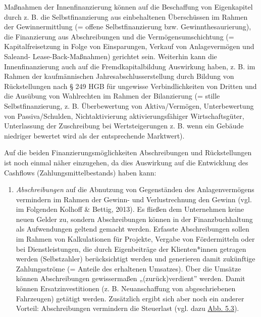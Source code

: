 \documentclass[
  letterpaper,
]{book}
\providecommand{\tightlist}{%
  \setlength{\itemsep}{0pt}\setlength{\parskip}{0pt}}
\begin{document}
Maßnahmen der Innenfinanzierung können auf die Beschaffung von
Eigenkapitel durch z. B. die Selbstfinanzierung aus einbehaltenen
Überschüssen im Rahmen der Gewinnermittlung (= offene Selbstfinanzierung
bzw. Gewinnthesaurierung), die Finanzierung aus Abschreibungen und die
Vermögensumschichtung (= Kapitalfreisetzung in Folge von Einsparungen,
Verkauf von Anlagevermögen und Saleand- Lease-Back-Maßnahmen) gerichtet
sein. Weiterhin kann die Innenfinanzierung auch auf die
Fremdkapitalbildung Auswirkung haben, z. B. im Rahmen der kaufmännischen
Jahresabschlusserstellung durch Bildung von Rückstellungen nach § 249
HGB für ungewisse Verbindlichkeiten von Dritten und die Ausübung von
Wahlrechten im Rahmen der Bilanzierung (= stille Selbstfinanzierung, z.
B. Überbewertung von Aktiva/Vermögen, Unterbewertung von
Passiva/Schulden, Nichtaktivierung aktivierungsfähiger Wirtschaftsgüter,
Unterlassung der Zuschreibung bei Wertsteigerungen z. B. wenn ein
Gebäude niedriger bewertet wird als der entsprechende Marktwert).

Auf die beiden Finanzierungsmöglichkeiten Abschreibungen und
Rückstellungen ist noch einmal näher einzugehen, da dies Auswirkung auf
die Entwicklung des Cashflows (Zahlungsmittelbestands) haben kann:

\begin{enumerate}
\def\labelenumi{\arabic{enumi}.}
\tightlist
\item
  \emph{Abschreibungen} auf die Abnutzung von Gegenständen des
  Anlagenvermögens vermindern im Rahmen der Gewinn- und Verlustrechnung
  den Gewinn (vgl. im Folgenden Kolhoff \& Bettig, 2013). Es fließen dem
  Unternehmen keine neuen Gelder zu, sondern Abschreibungen können in
  der Finanzbuchhaltung als Aufwendungen geltend gemacht werden.
  Erfasste Abschreibungen sollen im Rahmen von Kalkulationen für
  Projekte, Vergabe von Fördermitteln oder bei Dienstleistungen, die
  durch Eigenbeiträge der Klienten*innen getragen werden (Selbstzahler)
  berücksichtigt werden und generieren damit zukünftige Zahlungsströme
  (= Anteile des erhaltenen Umsatzes). Über die Umsätze können
  Abschreibungen gewissermaßen „(zurück)verdient'' werden. Damit können
  Ersatzinvestitionen (z. B. Neuanschaffung von abgeschriebenen
  Fahrzeugen) getätigt werden. Zusätzlich ergibt sich aber noch ein
  anderer Vorteil: Abschreibungen vermindern die Steuerlast (vgl. dazu
  \hyperref[figure53]{Abb. 5.3}).
\end{enumerate}
\end{document}
